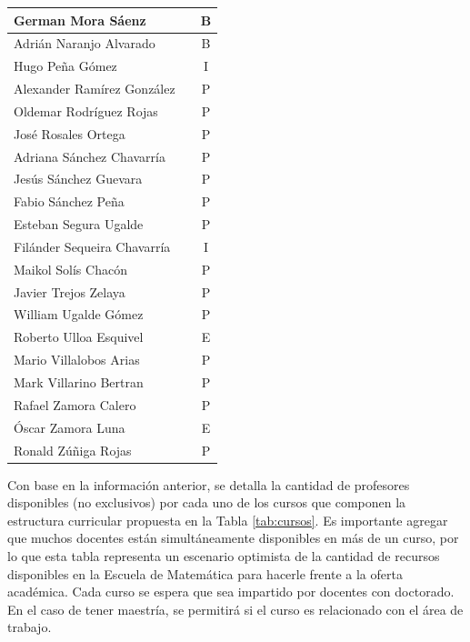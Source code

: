 \begin{longtable}[c]{|l|l|c|}
German Mora Sáenz &  & B \\ \hline
Adrián Naranjo Alvarado &  & B \\ \hline
Hugo Peña Gómez &  & I \\ \hline
Alexander Ramírez González &  & P \\ \hline
Oldemar Rodríguez Rojas &  & P \\ \hline
José Rosales Ortega &  & P \\ \hline
Adriana Sánchez Chavarría &  & P \\ \hline
Jesús Sánchez Guevara &  & P \\ \hline
Fabio Sánchez Peña &  & P \\ \hline
Esteban Segura Ugalde &  & P \\ \hline
Filánder Sequeira Chavarría &  & I \\ \hline
Maikol Solís Chacón &  & P \\ \hline
Javier Trejos Zelaya &  & P \\ \hline
William Ugalde Gómez &  & P \\ \hline
Roberto Ulloa Esquivel &  & E \\ \hline
Mario Villalobos Arias &  & P \\ \hline
Mark Villarino Bertran &  & P \\ \hline
Rafael Zamora Calero &  & P \\ \hline
Óscar Zamora Luna &  & E \\ \hline
Ronald Zúñiga Rojas &  & P \\ \hline
\end{longtable}


Con base en la información anterior, se detalla la cantidad de profesores disponibles (no exclusivos) por cada uno de los cursos que componen la estructura curricular propuesta en la Tabla \ref{tab:cursos}. Es importante agregar que muchos docentes están simultáneamente disponibles en más de un curso, por lo que esta tabla representa un escenario optimista de la cantidad de recursos disponibles en la Escuela de Matemática para hacerle frente a la oferta académica. Cada curso se espera que sea impartido por docentes con doctorado. En el caso de tener maestría, se permitirá si el  curso es relacionado con el área de trabajo. %


